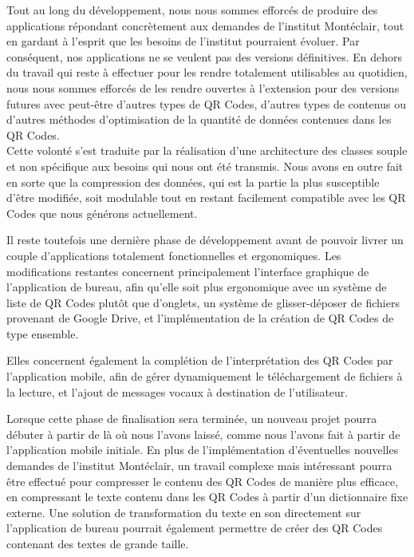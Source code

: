 \par
Tout au long du développement, nous nous sommes efforcés de produire des applications répondant concrètement aux demandes de l'institut Montéclair, tout en gardant à l'esprit que les besoins de l'institut pourraient évoluer. Par conséquent, nos applications ne se veulent pas des versions définitives. En dehors du travail qui reste à effectuer pour les rendre totalement utilisables au quotidien, nous nous sommes efforcés de les rendre ouvertes à l'extension pour des versions futures avec peut-être d'autres types de QR Codes, d'autres types de contenus ou d'autres méthodes d'optimisation de la quantité de données contenues dans les QR Codes.\\
Cette volonté s'est traduite par la réalisation d'une architecture des classes souple et non spécifique aux besoins qui nous ont été transmis. Nous avons en outre fait en sorte que la compression des données, qui est la partie la plus susceptible d'être modifiée, soit modulable tout en restant facilement compatible avec les QR Codes que nous générons actuellement.\\

\par
Il reste toutefois une dernière phase de développement avant de pouvoir livrer un couple d'applications totalement fonctionnelles et ergonomiques. Les modifications restantes concernent principalement l'interface graphique de l'application de bureau, afin qu'elle soit plus ergonomique avec un système de liste de QR Codes plutôt que d'onglets, un système de glisser-déposer de fichiers provenant de Google Drive, et l'implémentation de la création de QR Codes de type ensemble.
\par
Elles concernent également la complétion de l'interprétation des QR Codes par l'application mobile, afin de gérer dynamiquement le téléchargement de fichiers à la lecture, et l'ajout de messages vocaux à destination de l'utilisateur.\\

\par
Lorsque cette phase de finalisation sera terminée, un nouveau projet pourra débuter à partir de là où nous l'avons laissé, comme nous l'avons fait à partir de l'application mobile initiale. En plus de l'implémentation d'éventuelles nouvelles demandes de l'institut Montéclair, un travail complexe mais intéressant pourra être effectué pour compresser le contenu des QR Codes de manière plus efficace, en compressant le texte contenu dans les QR Codes à partir d'un dictionnaire fixe externe. Une solution de transformation du texte en son directement sur l'application de bureau pourrait également permettre de créer des QR Codes contenant des textes de grande taille.